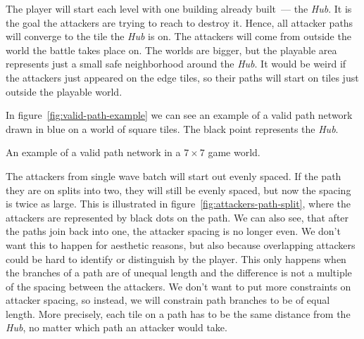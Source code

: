 The player will start each level with one building already built~--- the \emph{Hub}.
It is the goal the attackers are trying to reach to destroy it.
Hence, all attacker paths will converge to the tile the \emph{Hub} is on.
The attackers will come from outside the world the battle takes place on.
The worlds are bigger, but the playable area represents just a small safe neighborhood around the \emph{Hub}.
It would be weird if the attackers just appeared on the edge tiles, so their paths will start on tiles just outside the playable world.

In figure~\ref{fig:valid-path-example} we can see an example of a valid path network drawn in blue on a world of square tiles.
The black point represents the \emph{Hub}.

\begin{center}
    \captionsetup{type=figure}
    \caption{An example of a valid path network in a $7 \times 7$ game world.}
    \label{fig:valid-path-example}
\end{center}

The attackers from single wave batch will start out evenly spaced.
If the path they are on splits into two, they will still be evenly spaced, but now the spacing is twice as large.
This is illustrated in figure~\ref{fig:attackers-path-split}, where the attackers are represented by black dots on the path.
We can also see, that after the paths join back into one, the attacker spacing is no longer even.
We don't want this to happen for aesthetic reasons, but also because overlapping attackers could be hard to identify or distinguish by the player.
This only happens when the branches of a path are of unequal length and the difference is not a multiple of the spacing between the attackers.
We don't want to put more constraints on attacker spacing, so instead, we will constrain path branches to be of equal length.
More precisely, each tile on a path has to be the same distance from the \emph{Hub}, no matter which path an attacker would take.


